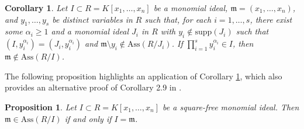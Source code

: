 \documentclass[11pt]{amsart}
\newtheorem{proposition}[theorem]{Proposition}
\newtheorem{corollary}[theorem]{Corollary}
\begin{document}
\begin{corollary}    \label{Cor.maximal-ideal.1}
Let $I\subset R=K[x_1, \ldots, x_n]$ be a monomial ideal, $\mathfrak{m}=(x_1, \ldots, x_n)$, and   $y_1, \ldots, y_s$ be distinct variables in $R$ such that, for each $i=1, \ldots, s$, there exist  some  $\alpha_i \geq 1$ and a   monomial  ideal $J_i$ in $R$  with $y_i\notin \mathrm{supp}(J_i)$ such that
 $(I,y_i^{\alpha_i})=(J_i, y_i^{\alpha_i})$ and $\mathfrak{m}\setminus y_i \notin \mathrm{Ass}(R/J_i)$. If  $\prod_{i=1}^{s}y_i^{\alpha_i} \in I$, 
 then $\mathfrak{m}\notin  \mathrm{Ass}(R/I)$. 
\end{corollary} 



The following proposition  highlights an application of   Corollary \ref{Cor.maximal-ideal.1}, which also provides an alternative proof of Corollary 2.9 in  \cite{NR}. 

\begin{proposition} \label{App.1}
Let $I\subset R=K[x_1, \ldots, x_n]$ be a square-free monomial ideal. Then $\mathfrak{m} \in \mathrm{Ass}(R/I)$ if and only if $I=\mathfrak{m}$.
\end{proposition}
\end{document}
